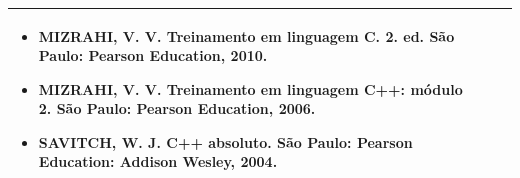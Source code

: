 \documentclass[11pt]{article}
\begin{document}
\begin{center}
\begin{longtable}{|p{4cm}|p{4cm}|p{4cm}|p{4cm}|}
{\begin{itemize}
\item MIZRAHI, V. V. Treinamento em linguagem C. 2. ed. São Paulo: Pearson Education, 2010.
\item MIZRAHI, V. V. Treinamento em linguagem C++: módulo 2. São Paulo: Pearson Education, 2006.
\item SAVITCH, W. J. C++ absoluto. São Paulo: Pearson Education: Addison Wesley, 2004.\end{itemize}}\\
\hline
\end{longtable}
\end{center}

\clearpage
\end{document}
